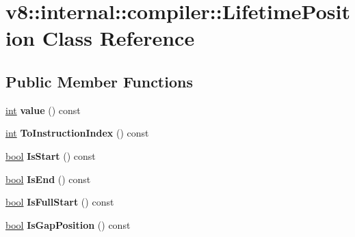 \hypertarget{classv8_1_1internal_1_1compiler_1_1LifetimePosition}{}\section{v8\+:\+:internal\+:\+:compiler\+:\+:Lifetime\+Position Class Reference}
\label{classv8_1_1internal_1_1compiler_1_1LifetimePosition}
\subsection*{Public Member Functions}
\begin{DoxyCompactItemize}
\item 
\mbox{\label{classv8_1_1internal_1_1compiler_1_1LifetimePosition_aa309fd80e2d8daf49cc58e4cedf9f934}} 
\mbox{\hyperlink{classint}{int}} {\bfseries value} () const
\item 
\mbox{\label{classv8_1_1internal_1_1compiler_1_1LifetimePosition_a8c2698630261d8bba154be0df220e84f}} 
\mbox{\hyperlink{classint}{int}} {\bfseries To\+Instruction\+Index} () const
\item 
\mbox{\label{classv8_1_1internal_1_1compiler_1_1LifetimePosition_ae3de40dd01dd4a502fc343b7b29b3448}} 
\mbox{\hyperlink{classbool}{bool}} {\bfseries Is\+Start} () const
\item 
\mbox{\label{classv8_1_1internal_1_1compiler_1_1LifetimePosition_a4edef965c8c118c718763ad16621ccb0}} 
\mbox{\hyperlink{classbool}{bool}} {\bfseries Is\+End} () const
\item 
\mbox{\label{classv8_1_1internal_1_1compiler_1_1LifetimePosition_abd54116a7f6e120375d39f1e814b40fd}} 
\mbox{\hyperlink{classbool}{bool}} {\bfseries Is\+Full\+Start} () const
\item 
\mbox{\label{classv8_1_1internal_1_1compiler_1_1LifetimePosition_ad66c72623d9ebbf765664f106dc76ba4}} 
\mbox{\hyperlink{classbool}{bool}} {\bfseries Is\+Gap\+Position} () const

\end{DoxyCompactItemize}
